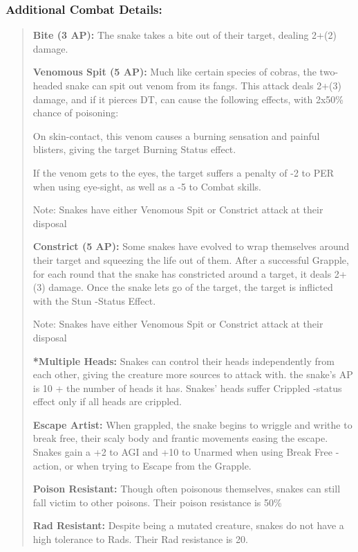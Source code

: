 \documentclass[11pt,a4paper,twocolumn]{book}
\begin{document}
	\subsubsection*{Additional Combat Details:}
	\begin{verse}
		\textbf{Bite (3 AP):} The snake takes a bite out of their target, dealing 2+(2) damage.
		
		\textbf{Venomous Spit (5 AP):} Much like certain species of cobras, the two-headed snake can spit out venom from its fangs. This attack deals 2+(3) damage, and if it pierces DT, can cause the following effects, with 2x50\% chance of poisoning: 
		\begin{compactitem}
			\item On skin-contact, this venom causes a burning sensation and painful blisters, giving the target Burning Status effect. 
			\item If the venom gets to the eyes, the target suffers a penalty of -2 to PER when using eye-sight, as well as a -5 to Combat skills.
			\item Note: Snakes have either Venomous Spit or Constrict attack at their disposal
		\end{compactitem}
		
		\textbf{Constrict (5 AP):} Some snakes have evolved to wrap themselves around their target and squeezing the life out of them. After a successful Grapple, for each round that the snake has constricted around a target, it deals 2+(3) damage. Once the snake lets go of the target, the target is inflicted with the Stun -Status Effect.
		\begin{compactitem}
			\item Note: Snakes have either Venomous Spit or Constrict attack at their disposal
		\end{compactitem}
		
		\textbf{*Multiple Heads:} Snakes can control their heads independently from each other, giving the creature more sources to attack with. the snake's AP is 10 + the number of heads it has. Snakes' heads suffer Crippled -status effect only if all heads are crippled.
		
		\textbf{Escape Artist:} When grappled, the snake begins to wriggle and writhe to break free, their scaly body and frantic movements easing the escape. Snakes gain a +2 to AGI and +10 to Unarmed when using Break Free -action, or when trying to Escape from the Grapple.
		
		\textbf{Poison Resistant:} Though often poisonous themselves, snakes can still fall victim to other poisons. Their poison resistance is 50\%
		
		\textbf{Rad Resistant:} Despite being a mutated creature, snakes do not have a high tolerance to Rads. Their Rad resistance is 20.
	\end{verse}
	
\end{document}
